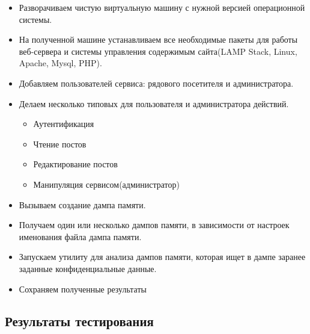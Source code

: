 \documentclass[20pt]{article}
\begin{document}
\begin{itemize}
  \item Разворачиваем чистую виртуальную машину с нужной версией операционной системы.
  \item На полученной машине устанавливаем все необходимые пакеты для работы
  веб-сервера и системы управления содержимым сайта(LAMP Stack, Linux, Apache,
  Mysql, PHP).
  \item Добавляем пользователей сервиса: рядового посетителя и администратора.
  \item Делаем несколько типовых для пользователя и администратора действий.
  \begin{itemize}
    \item Аутентификация
    \item Чтение постов
    \item Редактирование постов
    \item Манипуляция сервисом(администратор)
  \end{itemize}
  \item Вызываем создание дампа памяти.
  \item Получаем один или несколько дампов памяти, в зависимости от настроек
  именования файла дампа памяти.
  \item Запускаем утилиту для анализа дампов памяти, которая ищет в дампе
  заранее заданные конфиденциальные данные.
  \item Сохраняем полученные результаты
\end{itemize}

\subsection{Результаты тестирования}
\end{document}
